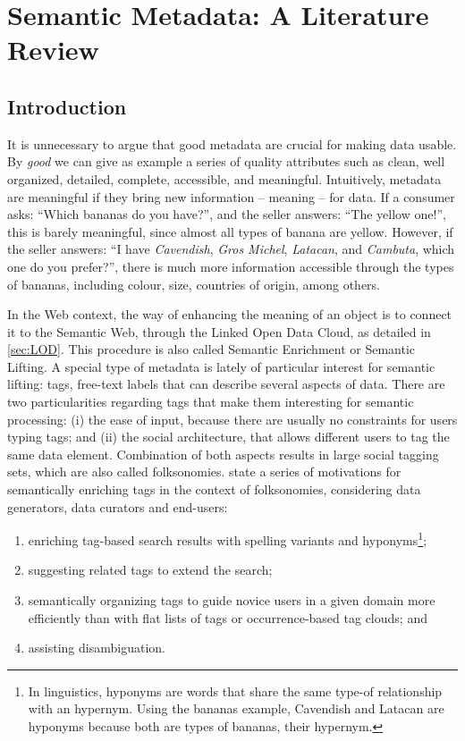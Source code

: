 \section{Semantic Metadata: A Literature Review}
\label{sec:semantic_metadata}

\subsection{Introduction}

It is unnecessary to argue that good metadata are crucial for making data usable.
By \emph{good} we can give as example a series of quality attributes such as clean, well organized, detailed, complete, accessible, and meaningful.
Intuitively, metadata are meaningful if they bring new information -- meaning -- for data.
If a consumer asks: ``Which bananas do you have?'', and the seller answers: ``The yellow one!'', this is barely meaningful, since almost all types of banana are yellow.
However, if the seller answers: ``I have \emph{Cavendish}, \emph{Gros Michel}, \emph{Latacan}, and \emph{Cambuta}, which one do you prefer?'', there is much more information accessible through the types of bananas, including colour, size, countries of origin, among others.

In the Web context, the way of enhancing the meaning of an object is to connect it to the Semantic Web, through the Linked Open Data Cloud, as detailed in \autoref{sec:LOD}.
This procedure is also called Semantic Enrichment or Semantic Lifting.
A special type of metadata is lately of particular interest for semantic lifting: tags, free-text labels that can describe several aspects of data.
There are two particularities regarding tags that make them interesting for semantic processing: (i) the ease of input, because there are usually no constraints for users typing tags; and (ii) the social architecture, that allows different users to tag the same data element.
Combination of both aspects results in large social tagging sets, which are also called folksonomies.
	 state a series of motivations for semantically enriching tags in the context of folksonomies, considering data generators, data curators and end-users:
\begin{enumerate}
	\item enriching tag-based search results with spelling variants and hyponyms\footnote{In linguistics, hyponyms are words that share the same type-of relationship with an hypernym. Using the bananas example, Cavendish and Latacan are hyponyms because both are types of bananas, their hypernym.};
	\item suggesting related tags to extend the search;
	\item semantically organizing tags to guide novice users in a given domain more efficiently than with flat lists of tags or occurrence-based tag clouds; and
	\item assisting disambiguation.
\end{enumerate}

